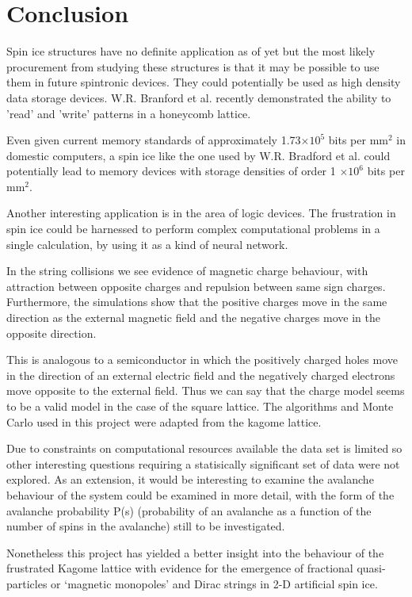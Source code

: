 \section{Conclusion}
Spin ice structures have no definite application as of yet but the most likely procurement from studying these structures is that it may be possible to use them in future spintronic devices. They could potentially be used as high density data storage devices. W.R. Branford et al. recently demonstrated the ability to 'read' and 'write' patterns in a honeycomb lattice. {\cite{b14}}
\par
Even given current memory standards of approximately 1.73$\times 10^{5}$ bits per mm$^{2}$ in domestic computers,  a spin ice like the one used by W.R. Bradford et al. could potentially lead to memory devices with storage densities of order 1 $\times 10^{6}$ bits per mm$^{2}$.
\par
Another interesting application is in the area of logic devices. The frustration in spin ice could be harnessed to perform complex computational problems in a single calculation, by using it as a kind of neural network.
\par
In the string collisions we see evidence of magnetic charge behaviour, with attraction between opposite charges and repulsion between same sign charges. Furthermore, the simulations show that the positive charges move in the same direction as the external magnetic field and the negative charges move in the opposite direction.
\par
This is analogous to a semiconductor in which the positively charged holes move in the direction of an external electric field and the negatively charged electrons move opposite to the external field. Thus we can say that the charge model seems to be a valid model in the case of the square lattice.  The algorithms and Monte Carlo used in this project were adapted from the kagome lattice.
\par
Due to constraints on computational resources available the data set is limited so other interesting questions requiring a statisically significant set of data were not explored. As an extension, it would be interesting to examine the avalanche behaviour of the system could be examined in more detail, with the form of the avalanche probability P(s) (probability of an avalanche as a function of the number of spins in the avalanche) still to be investigated.
\par
Nonetheless this project has yielded a better insight into the behaviour of the frustrated Kagome lattice with evidence for the emergence of fractional quasi-particles or `magnetic monopoles' and Dirac strings in 2-D artificial spin ice.
\clearpage
